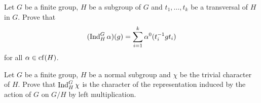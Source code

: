 \begin{exercise}
\label{xca:useful_Ind}
    Let $G$ be a finite group, $H$ be a subgroup
    of $G$ and $t_1,\dots,t_k$ be a transversal
    of $H$ in $G$. Prove that
    \[
    (\operatorname{Ind}_H^G\alpha)(g)=\sum_{i=1}^k\alpha^0(t_i^{-1}gt_i)
    \]
    for all $\alpha\in\operatorname{cf}(H)$.
\end{exercise}

\begin{exercise}
\label{xca:induction_G/H}
    Let $G$ be a finite group, $H$ be a normal
    subgroup and $\chi$ be the trivial
    character of $H$. Prove that
    $\operatorname{Ind}_H^G\chi$ is the character of the
    representation induced by the action of $G$ on $G/H$ by left multiplication. 
\end{exercise}


